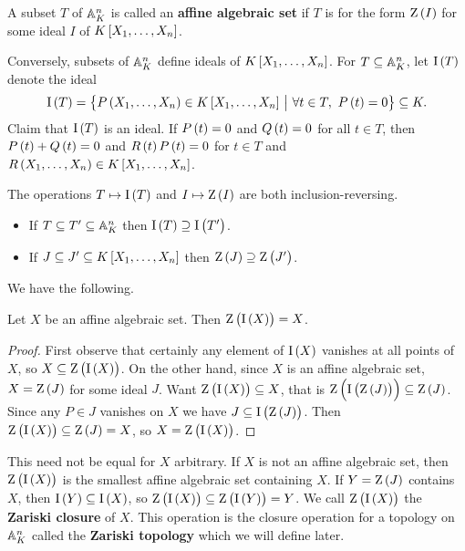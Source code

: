 \begin{definition}
A subset $ T $ of $ \AA_K^n $ is called an \textbf{affine algebraic set} if $ T $ is for the form $ \Z\br{I} $ for some ideal $ I $ of $ K\sbr{X_1, \dots, X_n} $.
\end{definition}

Conversely, subsets of $ \AA_K^n $ define ideals of $ K\sbr{X_1, \dots, X_n} $. For $ T \subseteq \AA_K^n $, let $ \I\br{T} $ denote the ideal
$$ \I\br{T} = \cbr{P\br{X_1, \dots, X_n} \in K\sbr{X_1, \dots, X_n} \st \forall t \in T, \ P\br{t} = 0} \subseteq K. $$
Claim that $ \I\br{T} $ is an ideal. If $ P\br{t} = 0 $ and $ Q\br{t} = 0 $ for all $ t \in T $, then $ P\br{t} + Q\br{t} = 0 $ and $ R\br{t}P\br{t} = 0 $ for $ t \in T $ and $ R\br{X_1, \dots, X_n} \in K\sbr{X_1, \dots, X_n} $.

\begin{note*}
The operations $ T \mapsto \I\br{T} $ and $ I \mapsto \Z\br{I} $ are both inclusion-reversing.
\begin{itemize}
\item If $ T \subseteq T' \subseteq \AA_K^n $ then $ \I\br{T} \supseteq \I\br{T'} $.
\item If $ J \subseteq J' \subseteq K\sbr{X_1, \dots, X_n} $ then $ \Z\br{J} \supseteq \Z\br{J'} $.
\end{itemize}
\end{note*}

We have the following.

\begin{lemma}
Let $ X $ be an affine algebraic set. Then $ \Z\br{\I\br{X}} = X $.
\end{lemma}

\begin{proof}
First observe that certainly any element of $ \I\br{X} $ vanishes at all points of $ X $, so $ X \subseteq \Z\br{\I\br{X}} $. On the other hand, since $ X $ is an affine algebraic set, $ X = \Z\br{J} $ for some ideal $ J $. Want $ \Z\br{\I\br{X}} \subseteq X $, that is $ \Z\br{\I\br{\Z\br{J}}} \subseteq \Z\br{J} $. Since any $ P \in J $ vanishes on $ X $ we have $ J \subseteq \I\br{\Z\br{J}} $. Then $ \Z\br{\I\br{X}} \subseteq \Z\br{J} = X $, so $ X = \Z\br{\I\br{X}} $.
\end{proof}

This need not be equal for $ X $ arbitrary. If $ X $ is not an affine algebraic set, then $ \Z\br{\I\br{X}} $ is the smallest affine algebraic set containing $ X $. If $ Y = \Z\br{J} $ contains $ X $, then $ \I\br{Y} \subseteq \I\br{X} $, so $ \Z\br{\I\br{X}} \subseteq \Z\br{\I\br{Y}} = Y $. We call $ \Z\br{\I\br{X}} $ the \textbf{Zariski closure} of $ X $. This operation is the closure operation for a topology on $ \AA_K^n $ called the \textbf{Zariski topology} which we will define later.


